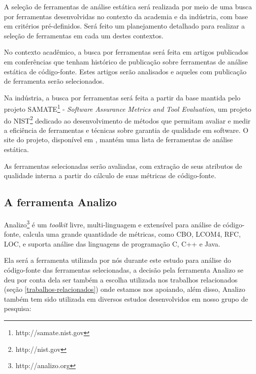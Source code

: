 A seleção de ferramentas de análise estática será realizada por meio de uma
busca por ferramentas desenvolvidas no contexto da academia e da indústria,
com base em critérios pré-definidos. Será feito um planejamento detalhado
para realizar a seleção de ferramentas em cada um destes contextos.

No contexto acadêmico, a busca por ferramentas será feita em artigos
publicados em conferências que tenham histórico de publicação sobre
ferramentas de análise estática de código-fonte.  Estes artigos serão
analisados e aqueles com publicação de ferramenta serão selecionados.

Na indústria, a busca por ferramentas será feita a partir da base mantida pelo
projeto SAMATE\footnote{http://samate.nist.gov} - {\em Software Assurance
Metrics and Tool Evaluation}, um projeto do NIST\footnote{http://nist.gov}
dedicado ao desenvolvimento de métodos que permitam avaliar e medir a
eficiência de ferramentas e técnicas sobre garantia de qualidade em software.
O site do projeto, disponível em , mantém uma lista
de ferramentas de análise estática.

As ferramentas selecionadas serão avaliadas, com extração de
seus atributos de qualidade interna a partir do cálculo de suas métricas de
código-fonte.

\subsection{A ferramenta Analizo}

Analizo\footnote{http://analizo.org} é um {\it toolkit} livre, multi-linguagem
e extensível para análise de código-fonte, calcula uma grande quantidade de
métricas, como CBO, LCOM4, RFC, LOC, e suporta análise das linguagens de
programação C, C++ e Java.

Ela será a ferramenta utilizada por nós durante este estudo para análise do
código-fonte das ferramentas selecionadas, a decisão pela ferramenta Analizo
se deu por conta dela ser também a escolha utilizada nos trabalhos
relacionados (seção \ref{trabalhos-relacionados}) onde estamos nos apoiando,
além disso, Analizo também tem sido utilizada em diversos estudos
desenvolvidos em nosso grupo de pesquisa:

